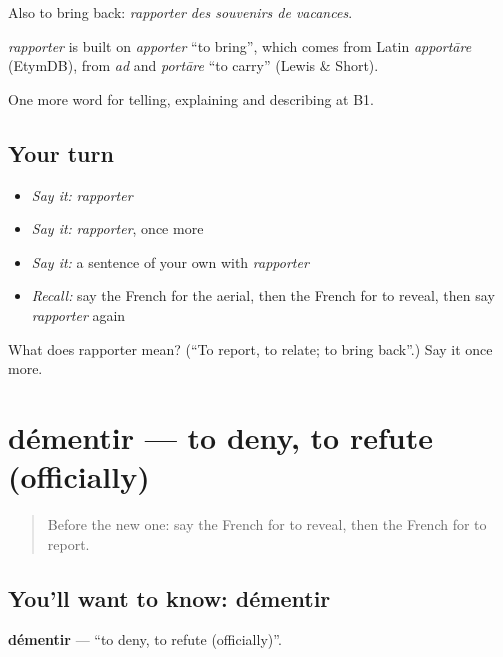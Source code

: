 Also to bring back: \emph{rapporter des souvenirs de vacances}.

\begin{cousinweb}
\emph{rapporter} is built on \emph{apporter} \textquotedblleft{}to bring\textquotedblright{}, which comes from Latin \emph{apportāre} (EtymDB), from \emph{ad} and \emph{portāre} \textquotedblleft{}to carry\textquotedblright{} (Lewis \& Short).
\end{cousinweb}

\begin{grammarlens}[title={What you've built}]
One more word for telling, explaining and describing at B1.
\end{grammarlens}

\subsection*{Your turn}
\begin{itemize}
\raggedright
  \item \emph{Say it:} \emph{rapporter}
  \item \emph{Say it:} \emph{rapporter}, once more
  \item \emph{Say it:} a sentence of your own with \emph{rapporter}
  \item \emph{Recall:} say the French for the aerial, then the French for to reveal, then say \emph{rapporter} again
\end{itemize}

\begin{tcolorbox}[breakable,colback=teal!4,colframe=teal!35!black,title={Before you move on}]
What does rapporter mean? (\textquotedblleft{}To report, to relate; to bring back\textquotedblright{}.) Say it once more.
\end{tcolorbox}
\section[démentir]{démentir — to deny, to refute (officially)}

\label{lesson:FR-C284-dementir}



\begin{quote}
Before the new one: say the French for to reveal, then the French for to report.
\end{quote}

\subsection*{You'll want to know: démentir}
\textbf{démentir} — \textquotedblleft{}to deny, to refute (officially)\textquotedblright{}.

